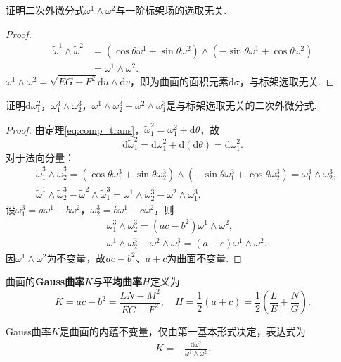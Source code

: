 \documentclass[../../main.tex]{subfiles}%
\begin{document}
\begin{example}
证明二次外微分式$\omega^1\land\omega^2$与一阶标架场的选取无关.
\begin{proof}
\begin{align*}
\tilde{\omega}^1\land\tilde{\omega}^2 &= (\cos\theta\omega^1+\sin\theta\omega^2)\land(-\sin\theta\omega^1+\cos\theta\omega^2) \\
&= \omega^1\land\omega^2.
\end{align*}
$\omega^1\land\omega^2=\sqrt{EG-F^2}\mathrm{d}u\land\mathrm{d}v$，即为曲面的面积元素$\mathrm{d}\sigma$，与标架选取无关.
\end{proof}
\end{example}

\begin{example}
证明$\mathrm{d}\omega_1^2$，$\omega_1^3\land\omega_2^3$，$\omega^1\land\omega_2^3-\omega^2\land\omega_1^3$是与标架选取无关的二次外微分式.
\begin{proof}
由定理\eqref{eq:comp_trans}，$\tilde{\omega}_1^2=\omega_1^2+\mathrm{d}\theta$，故
$$\mathrm{d}\tilde{\omega}_1^2=\mathrm{d}\omega_1^2+\mathrm{d}(\mathrm{d}\theta)=\mathrm{d}\omega_1^2.$$
对于法向分量：
\begin{align*}
&\tilde{\omega}_1^3\land\tilde{\omega}_2^3 = (\cos\theta\omega_1^3+\sin\theta\omega_2^3)\land(-\sin\theta\omega_1^3+\cos\theta\omega_2^3) = \omega_1^3\land\omega_2^3, \\
&\tilde{\omega}^1\land\tilde{\omega}_2^3-\tilde{\omega}^2\land\tilde{\omega}_1^3 = \omega^1\land\omega_2^3-\omega^2\land\omega_1^3.
\end{align*}
设$\omega_1^3=a\omega^1+b\omega^2$，$\omega_2^3=b\omega^1+c\omega^2$，则
\begin{align*}
&\omega_1^3\land\omega_2^3 = (ac-b^2)\omega^1\land\omega^2, \\
&\omega^1\land\omega_2^3-\omega^2\land\omega_1^3 = (a+c)\omega^1\land\omega^2.
\end{align*}
因$\omega^1\land\omega^2$为不变量，故$ac-b^2$、$a+c$为曲面不变量.
\end{proof}
\end{example}

\begin{definition}
曲面的\textbf{Gauss曲率}$K$与\textbf{平均曲率}$H$定义为
$$K=ac-b^2=\frac{LN-M^2}{EG-F^2},\quad H=\frac{1}{2}(a+c)=\frac{1}{2}\left(\frac{L}{E}+\frac{N}{G}\right).$$
\end{definition}

\begin{theorem}
Gauss曲率$K$是曲面的内蕴不变量，仅由第一基本形式决定，表达式为
\begin{align}
K = -\frac{\mathrm{d}\omega_1^2}{\omega^1\land\omega^2}. \label{eq:gauss_curv}
\end{align}
\end{theorem}
\end{document}
